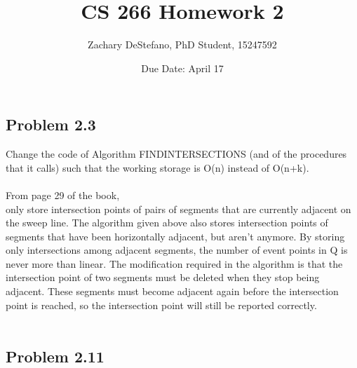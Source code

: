 \documentclass[11pt,psfig]{article}
\begin{document}
\setlength{\parskip}{1.2ex plus0.3ex minus 0.3ex}


\thispagestyle{empty} \pagestyle{myheadings} 



\title{CS 266 Homework 2}
\author{Zachary DeStefano, PhD Student, 15247592}
\date{Due Date: April 17}

\maketitle

\vfill\eject

\subsection*{Problem 2.3}

Change the code of Algorithm FINDINTERSECTIONS (and of the procedures
that it calls) such that the working storage is O(n) instead of
O(n+k).\\
\\
From page 29 of the book, \\
only store intersection
points of pairs of segments that are currently adjacent on the sweep line. The
algorithm given above also stores intersection points of segments that have
been horizontally adjacent, but aren’t anymore. By storing only intersections
among adjacent segments, the number of event points in Q is never more than
linear. The modification required in the algorithm is that the intersection point
of two segments must be deleted when they stop being adjacent. These segments
must become adjacent again before the intersection point is reached, so the
intersection point will still be reported correctly.\\
\\

\subsection*{Problem 2.11}
\end{document}
